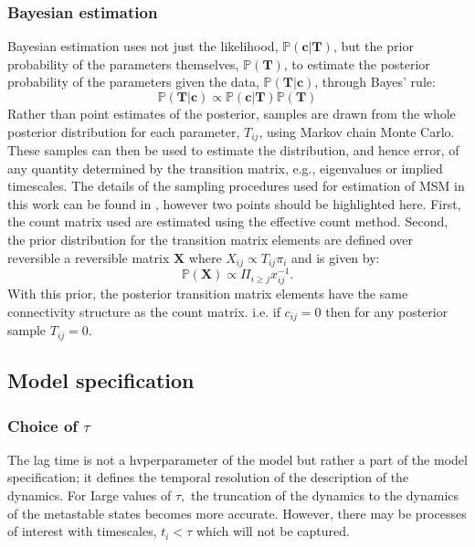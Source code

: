 \subsubsection{Bayesian estimation}
Bayesian estimation \cite{gelmanBayesianDataAnalysis2014} uses not just the likelihood, $\mathbb{P}(\mathbf{c}|\mathbf{T})$, but the prior probability of the parameters themselves, $\mathbb{P}(\mathbf{T})$, to estimate the posterior probability of the parameters given the data, $\mathbb{P}(\mathbf{T}|\mathbf{c})$, through Bayes' rule: 
\begin{equation}
    \mathbb{P}(\mathbf{T}|\mathbf{c}) \propto \mathbb{P}(\mathbf{c}|\mathbf{T})\mathbb{P}(\mathbf{T})
\end{equation}
Rather than point estimates of the posterior, samples are drawn from the whole posterior distribution for each parameter, $T_{ij}$, using Markov chain Monte Carlo\cite{gelmanBayesianDataAnalysis2014}. These samples can then be used to estimate the distribution, and hence error, of any quantity determined by the transition matrix, e.g., eigenvalues or implied timescales. The details of the sampling procedures used for estimation of MSM in this work can be found in \cite{trendelkamp-schroerEstimationUncertaintyReversible2015b}, however two points should be highlighted here. First, the count matrix used are estimated using the effective count method. Second, the prior distribution for the transition matrix elements are defined over reversible a reversible matrix $\mathbf{X}$ where $X_{ij}\propto T_{ij}\pi_{i}$ and is given by: 
\begin{equation}
    \mathbb{P}(\mathbf{X}) \propto \Pi_{i \ge j}x_{ij}^{-1}. 
\end{equation}
With this prior, the posterior transition matrix elements have the same connectivity structure as the count matrix. i.e. if $c_{ij}=0$ then for any posterior sample $T_{ij}=0$. 





\subsection{Model specification}
\subsubsection{Choice of $\tau$}
 The lag time is not a hvperparameter of the model but rather a part of the model specification; it defines the temporal resolution of the description of the dynamics. For
Iarge values of $\tau,$ the truncation of the dynamics to the dynamics of the metastable states becomes more accurate. However, there may be processes of interest with timescales, $t_{i}<\tau$ which will not be captured.

